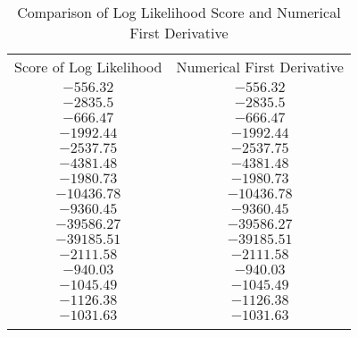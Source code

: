 \begin{table}[!t]
    \centering \small
    \caption{Comparison of Log Likelihood Score and Numerical First Derivative}
    \begin{tabular}{cc}
    \par \toprule
    Score of Log Likelihood & Numerical First Derivative\\
    \par \midrule
    $-556.32$ & $-556.32$\\
    $-2835.5$ & $-2835.5$\\
    $-666.47$ & $-666.47$\\
    $-1992.44$ & $-1992.44$\\
    $-2537.75$ & $-2537.75$\\
    $-4381.48$ & $-4381.48$\\
    $-1980.73$ & $-1980.73$\\
    $-10436.78$ & $-10436.78$\\
    $-9360.45$ & $-9360.45$\\
    $-39586.27$ & $-39586.27$\\
    $-39185.51$ & $-39185.51$\\
    $-2111.58$ & $-2111.58$\\
    $-940.03$ & $-940.03$\\
    $-1045.49$ & $-1045.49$\\
    $-1126.38$ & $-1126.38$\\
    $-1031.63$ & $-1031.63$\\
    \par \toprule
    \end{tabular}
    \label{tab2}
\end{table}